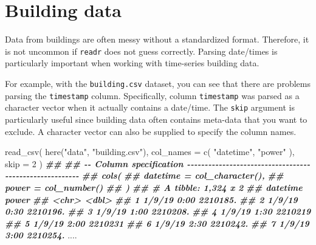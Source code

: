 \documentclass[
]{book}
\newenvironment{Shaded}{\begin{snugshade}}{\end{snugshade}}
\newcommand{\AttributeTok}[1]{\textcolor[rgb]{0.77,0.63,0.00}{#1}}
\newcommand{\DecValTok}[1]{\textcolor[rgb]{0.00,0.00,0.81}{#1}}
\newcommand{\DocumentationTok}[1]{\textcolor[rgb]{0.56,0.35,0.01}{\textbf{\textit{#1}}}}
\newcommand{\FunctionTok}[1]{\textcolor[rgb]{0.00,0.00,0.00}{#1}}
\newcommand{\NormalTok}[1]{#1}
\newcommand{\StringTok}[1]{\textcolor[rgb]{0.31,0.60,0.02}{#1}}
\begin{document}
\hypertarget{building-data}{%
\section{Building data}\label{building-data}}

Data from buildings are often messy without a standardized format. Therefore, it is not uncommon if \texttt{readr} does not guess correctly. Parsing date/times is particularly important when working with time-series building data.

For example, with the \texttt{building.csv} dataset, you can see that there are problems parsing the \texttt{timestamp} column. Specifically, column \texttt{timestamp} was parsed as a character vector when it actually contains a date/time. The \texttt{skip} argument is particularly useful since building data often contains meta-data that you want to exclude. A character vector can also be supplied to specify the column names.

\begin{Shaded}
\begin{Highlighting}[]

\FunctionTok{read\_csv}\NormalTok{(}
  \FunctionTok{here}\NormalTok{(}\StringTok{"data"}\NormalTok{, }\StringTok{"building.csv"}\NormalTok{),}
  \AttributeTok{col\_names =} \FunctionTok{c}\NormalTok{(}
    \StringTok{"datetime"}\NormalTok{,}
    \StringTok{"power"}
\NormalTok{  ),}
  \AttributeTok{skip =} \DecValTok{2}
\NormalTok{)}
\DocumentationTok{\#\# }
\DocumentationTok{\#\# {-}{-} Column specification {-}{-}{-}{-}{-}{-}{-}{-}{-}{-}{-}{-}{-}{-}{-}{-}{-}{-}{-}{-}{-}{-}{-}{-}{-}{-}{-}{-}{-}{-}{-}{-}{-}{-}{-}{-}{-}{-}{-}{-}{-}{-}{-}{-}{-}{-}{-}{-}{-}{-}{-}{-}{-}{-}{-}{-}}
\DocumentationTok{\#\# cols(}
\DocumentationTok{\#\#   datetime = col\_character(),}
\DocumentationTok{\#\#   power = col\_number()}
\DocumentationTok{\#\# )}
\DocumentationTok{\#\# \# A tibble: 1,324 x 2}
\DocumentationTok{\#\#    datetime       power}
\DocumentationTok{\#\#    \textless{}chr\textgreater{}          \textless{}dbl\textgreater{}}
\DocumentationTok{\#\#  1 1/9/19 0:00 2210185.}
\DocumentationTok{\#\#  2 1/9/19 0:30 2210196.}
\DocumentationTok{\#\#  3 1/9/19 1:00 2210208.}
\DocumentationTok{\#\#  4 1/9/19 1:30 2210219 }
\DocumentationTok{\#\#  5 1/9/19 2:00 2210231 }
\DocumentationTok{\#\#  6 1/9/19 2:30 2210242.}
\DocumentationTok{\#\#  7 1/9/19 3:00 2210254.}
\NormalTok{....}
\end{Highlighting}
\end{Shaded}
\end{document}
